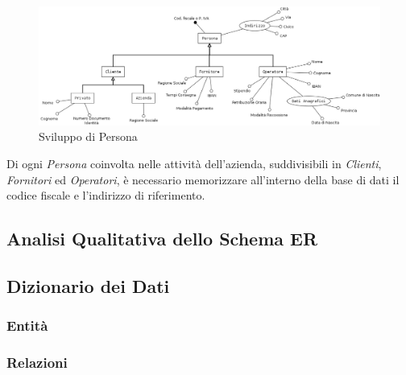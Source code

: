 			\begin{figure}[H]
				\centering
				\includegraphics[width=12cm]{images/finitures/persona.png}
				\caption{Sviluppo di Persona}
				\label{fig:persona}
			\end{figure}
			
			Di ogni \emph{Persona} coinvolta nelle attività dell'azienda, suddivisibili in \emph{Clienti}, \emph{Fornitori} ed \emph{Operatori}, è necessario memorizzare all'interno della base di dati il codice fiscale e l'indirizzo di riferimento.		

	
	\subsection{Analisi Qualitativa dello Schema ER}
	
	\subsection{Dizionario dei Dati}
		
		\subsubsection{Entità}
		
		\subsubsection{Relazioni}